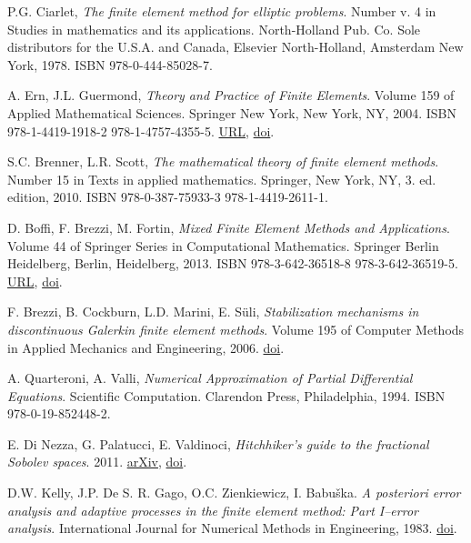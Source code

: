 \documentclass[a4paper, 11pt]{book}
\theoremstyle{plain}
\theoremstyle{definition}
\numberwithin{equation}{chapter}
\numberwithin{figure}{chapter}
\numberwithin{table}{chapter}
\begin{document}
\begin{thebibliography}{9}
P.G. Ciarlet, \emph{The finite element method for elliptic problems}. Number v. 4 in Studies in mathematics and its applications. North-Holland Pub. Co. Sole distributors for the U.S.A. and Canada, Elsevier North-Holland, Amsterdam New York, 1978. ISBN 978-0-444-85028-7.

A. Ern, J.L. Guermond, \emph{Theory and Practice of Finite Elements}. Volume 159 of Applied Mathematical Sciences. Springer New York, New York, NY, 2004. ISBN 978-1-4419-1918-2 978-1-4757-4355-5. \href{http://link.springer.com/10.1007/978-1-4757-4355-5}{URL}, \href{https://doi.org/10.1007/978-1-4757-4355-5}{doi}.

S.C. Brenner, L.R. Scott, \emph{The mathematical theory of finite element methods}. Number 15 in Texts in applied mathematics. Springer, New York, NY, 3. ed. edition, 2010. ISBN 978-0-387-75933-3 978-1-4419-2611-1.

D. Boffi, F. Brezzi, M. Fortin, \emph{Mixed Finite Element Methods and Applications}. Volume 44 of Springer Series in Computational Mathematics. Springer Berlin Heidelberg, Berlin, Heidelberg, 2013. ISBN 978-3-642-36518-8 978-3-642-36519-5. \href{http://link.springer.com/10.1007/978-3-642-36519-5}{URL}, \href{https://doi.org/10.1007/978-3-642-36519-5}{doi}.

F. Brezzi, B. Cockburn, L.D. Marini, E. S\"uli,
\emph{Stabilization mechanisms in discontinuous Galerkin finite element methods}. Volume 195 of Computer Methods in Applied Mechanics and Engineering, 2006. \href{https://doi.org/10.1016/j.cma.2005.06.015}{doi}.

A. Quarteroni, A. Valli, \emph{Numerical Approximation of Partial Differential Equations}. Scientific Computation. Clarendon Press, Philadelphia, 1994. ISBN 978-0-19-852448-2.

E. Di Nezza, G. Palatucci, E. Valdinoci,
\emph{Hitchhiker’s guide to the fractional Sobolev spaces}. 2011.
\href{https://arxiv.org/abs/1104.4345v3}{arXiv}, \href{https://doi.org/10.48550/arXiv.1104.4345}{doi}.

D.W. Kelly, J.P. De S. R. Gago, O.C. Zienkiewicz, I. Babu\v{s}ka. \emph{A posteriori error analysis and adaptive processes in the finite element method: Part I–error analysis}. International Journal for Numerical Methods in Engineering, 1983. \href{https://doi.org/10.1002/nme.1620191103}{doi}.
\end{thebibliography}
\end{document}
